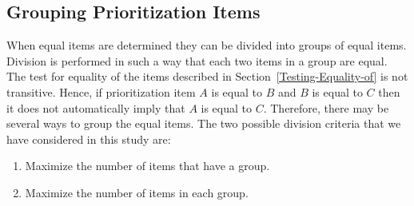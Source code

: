 \subsection{Grouping Prioritization Items}
When equal items are determined they can be divided into groups of equal items. Division is performed in such a way that each two items in a group are equal. The test for equality of the items described in Section~\ref{Testing-Equality-of} is not transitive. Hence, if prioritization item $A$ is equal to $B$ and $B$ is equal to $C$ then it does not automatically imply that $A$ is equal to $C$. Therefore, there may be several ways to group the equal items. The two possible division criteria that we have considered in this study are:

\begin{enumerate}
\item Maximize the number of items that have a group.
\item Maximize the number of items in each group.
\end{enumerate}
